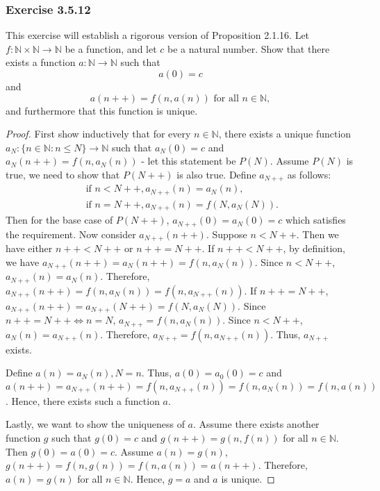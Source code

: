 \documentclass[12pt, letter]{article}
\begin{document}
\subsubsection*{Exercise 3.5.12}
This exercise will establish a rigorous version of Proposition 2.1.16. Let $f:\mathbb{N}\times \mathbb{N}\to \mathbb{N}$ be a function, and let $c$ be a natural number. Show that there exists a function $a:\mathbb{N}\to \mathbb{N}$ such that 
\begin{equation*}
    a(0)=c
\end{equation*}
and 
\begin{equation*}
    a(n++)=f(n,a(n))\text{ for all }n\in \mathbb{N},
\end{equation*}
and furthermore that this function is unique.
\begin{proof}
    First show inductively that for every $n\in\mathbb{N}$, there exists a unique function $a_N:\{n\in\mathbb{N}:n\leq N\}\to \mathbb{N}$ such that $a_N(0)=c$ and $a_N(n++)=f(n,a_N(n))$ - let this statement be $P(N)$. Assume $P(N)$ is true, we need to show that 
    $P(N++)$ is also true. Define $a_{N++}$ as follows: 
    \begin{equation*}
        \begin{gathered}
            \text{ if }n < N++, a_{N++}(n)=a_N(n),\\
            \text{ if }n = N++, a_{N++}(n)=f(N,a_N(N)).
        \end{gathered}
    \end{equation*}
    Then for the base case of $P(N++)$, $a_{N++}(0)=a_N(0)=c$ which satisfies the requirement. Now consider $a_{N++}(n++)$. Suppose $n<N++$. Then we have either $n++<N++$ or $n++=N++$. If $n++<N++$, by definition, we have $a_{N++}(n++)=a_N(n++)=f(n,a_N(n))$. Since $n<N++$,
    $a_{N++}(n)=a_N(n)$. Therefore, $a_{N++}(n++)=f(n,a_N(n))=f(n,a_{N++}(n))$. If $n++=N++$, $a_{N++}(n++)=a_{N++}(N++)=f(N,a_N(N))$. Since $n++=N++\iff n=N$, $a_{N++}=f(n,a_N(n))$. Since $n<N++$, $a_N(n)=a_{N++}(n)$. Therefore, $a_{N++}=f(n,a_{N++}(n))$. 
    Thus, $a_{N++}$ exists. 
    
    Define $a(n)=a_N(n), N=n$. Thus, $a(0)=a_0(0)=c$ and $a(n++)=a_{N++}(n++)=f(n,a_{N++}(n))=f(n,a_N(n))=f(n,a(n))$. Hence, there exists such a function $a$.

    Lastly, we want to show the uniqueness of $a$. Assume there exists another function $g$ such that $g(0)=c$ and $g(n++)=g(n,f(n))$ for all $n\in \mathbb{N}$. Then $g(0)=a(0)=c$. Assume $a(n)=g(n)$, $g(n++)=f(n,g(n))=f(n,a(n))=a(n++)$. Therefore, $a(n)=g(n)$ for all $n\in \mathbb{N}$. 
    Hence, $g=a$ and $a$ is unique.
\end{proof}
\end{document}
